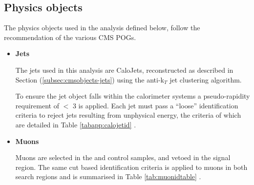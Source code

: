 \subsection{Physics objects}
\label{subsec:physicsobjects}

The physics objects used in the analysis defined below, follow the recommendation of the various \ac{CMS} \acf{POGs}. 

\begin{itemize}

\item \textbf{Jets}

The jets used in this analysis are CaloJets, reconstructed as described in Section (\ref{subsec:cmsobjects-jets}) using the anti-k$_{T}$ jet clustering algorithm. 

To ensure the jet object falls within the calorimeter systems a pseudo-rapidity requirement of \abeta $<$ 3 is applied. Each jet must pass a ``loose'' identification criteria to reject jets resulting from unphysical energy, the criteria of which are detailed in Table \ref{tabapp:calojetid} \cite{CMS-PAS-JME-09-008}.

\item \textbf{Muons}

Muons are selected in the \mupjets and \dimupjets control samples, and vetoed in the signal region. The same cut based identification criteria is applied to muons in both search regions and is summarised in Table \ref{tab:muonidtable} \cite{2012JInst...7P0002T}.


\end{itemize}
